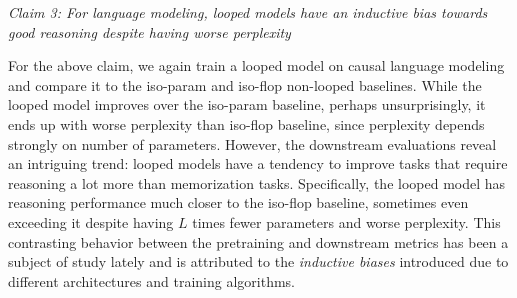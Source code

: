 \vspace{-0.05in}
\begin{center}
    \textit{Claim 3: For language modeling, looped models have an inductive bias towards good reasoning despite having worse perplexity}
\end{center}
\vspace{-0.05in}
For the above claim, we again train a  looped model on causal language modeling and compare it to the iso-param  and iso-flop  non-looped baselines. While the looped model improves over the iso-param baseline, perhaps unsurprisingly, it ends up with worse perplexity than iso-flop baseline, since perplexity depends strongly on number of parameters. However, the downstream evaluations reveal an intriguing trend: looped models have a tendency to improve tasks that require reasoning a lot more than memorization tasks.
Specifically, the looped model has reasoning performance much closer to the iso-flop baseline, sometimes even exceeding it despite having $L$ times fewer parameters and worse perplexity.
This contrasting behavior between the pretraining and downstream metrics has been a subject of study lately \citep{saunshi22understanding,liu2023same} and is attributed to the \emph{inductive biases} introduced due to different architectures and training algorithms.

